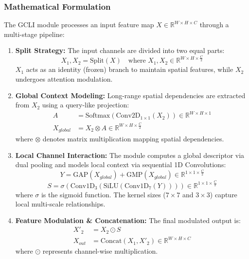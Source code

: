 \subsubsection{Mathematical Formulation}
The GCLI module processes an input feature map $X \in \mathbb{R}^{W \times H \times C}$ through a multi-stage pipeline:
\begin{enumerate}
    \item \textbf{Split Strategy:} The input channels are divided into two equal parts:
    \begin{equation}
        X_1, X_2 = \text{Split}(X) \quad \text{where } X_1, X_2 \in \mathbb{R}^{W \times H \times \frac{C}{2}}
    \end{equation}
    $X_1$ acts as an identity (frozen) branch to maintain spatial features, while $X_2$ undergoes attention modulation.

    \item \textbf{Global Context Modeling:} Long-range spatial dependencies are extracted from $X_2$ using a query-like projection:
    \begin{align}
        A &= \text{Softmax}(\text{Conv2D}_{1\times1}(X_2)) \in \mathbb{R}^{W \times H \times 1} \\
        X_{global} &= X_2 \otimes A \in \mathbb{R}^{W \times H \times \frac{C}{2}}
    \end{align}
    where $\otimes$ denotes matrix multiplication mapping spatial dependencies.

    \item \textbf{Local Channel Interaction:} The module computes a global descriptor via dual pooling and models local context via sequential 1D Convolutions:
    \begin{equation}
        Y = \text{GAP}(X_{global}) + \text{GMP}(X_{global}) \in \mathbb{R}^{1 \times 1 \times \frac{C}{2}}
    \end{equation}
    \begin{equation}
        S = \sigma\left(\text{Conv1D}_{3}\left(\text{SiLU}\left(\text{Conv1D}_{7}(Y)\right)\right)\right) \in \mathbb{R}^{1 \times 1 \times \frac{C}{2}}
    \end{equation}
    where $\sigma$ is the sigmoid function. The kernel sizes ($7\times7$ and $3\times3$) capture local multi-scale relationships.

    \item \textbf{Feature Modulation \& Concatenation:} The final modulated output is:
    \begin{align}
        X'_2 &= X_2 \odot S \\
        X_{out} &= \text{Concat}(X_1, X'_2) \in \mathbb{R}^{W \times H \times C}
    \end{align}
    where $\odot$ represents channel-wise multiplication.
\end{enumerate}

